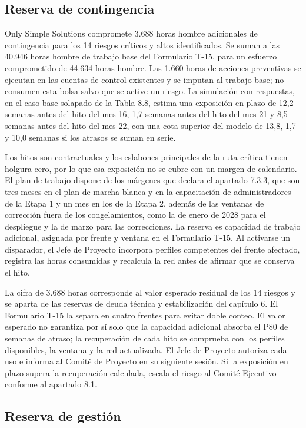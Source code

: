 \documentclass[11pt]{article}
\begin{document}
\subsection{Reserva de contingencia}

Only Simple Solutions compromete 3.688 horas hombre adicionales de contingencia para los 14 riesgos críticos y altos identificados. Se suman a las 40.946 horas hombre de trabajo base del Formulario T-15, para un esfuerzo comprometido de 44.634 horas hombre. Las 1.660 horas de acciones preventivas se ejecutan en las cuentas de control existentes y se imputan al trabajo base; no consumen esta bolsa salvo que se active un riesgo. La simulación con respuestas, en el caso base solapado de la Tabla 8.8, estima una exposición en plazo de 12,2 semanas antes del hito del mes 16, 1,7 semanas antes del hito del mes 21 y 8,5 semanas antes del hito del mes 22, con una cota superior del modelo de 13,8, 1,7 y 10,0 semanas si los atrasos se suman en serie.

Los hitos son contractuales y los eslabones principales de la ruta crítica tienen holgura cero, por lo que esa exposición no se cubre con un margen de calendario. El plan de trabajo dispone de los márgenes que declara el apartado 7.3.3, que son tres meses en el plan de marcha blanca y en la capacitación de administradores de la Etapa 1 y un mes en los de la Etapa 2, además de las ventanas de corrección fuera de los congelamientos, como la de enero de 2028 para el despliegue y la de marzo para las correcciones. La reserva es capacidad de trabajo adicional, asignada por frente y ventana en el Formulario T-15. Al activarse un disparador, el Jefe de Proyecto incorpora perfiles competentes del frente afectado, registra las horas consumidas y recalcula la red antes de afirmar que se conserva el hito.

La cifra de 3.688 horas corresponde al valor esperado residual de los 14 riesgos y se aparta de las reservas de deuda técnica y estabilización del capítulo 6. El Formulario T-15 la separa en cuatro frentes para evitar doble conteo. El valor esperado no garantiza por sí solo que la capacidad adicional absorba el P80 de semanas de atraso; la recuperación de cada hito se comprueba con los perfiles disponibles, la ventana y la red actualizada. El Jefe de Proyecto autoriza cada uso e informa al Comité de Proyecto en su siguiente sesión. Si la exposición en plazo supera la recuperación calculada, escala el riesgo al Comité Ejecutivo conforme al apartado 8.1.

\subsection{Reserva de gestión}
\end{document}
